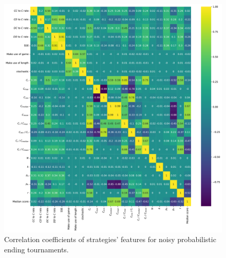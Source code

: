 \begin{figure}[!htbp]
    \begin{center}
        \includegraphics[width=.75\linewidth]{../images/probend_noise_correlation_plot.pdf}
    \end{center}
    \caption{Correlation coefficients of strategies' features for noisy probabilistic ending tournaments.}
\end{figure}
